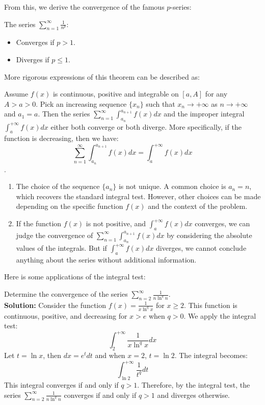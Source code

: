 From this, we derive the convergence of the famous $p$-series:
\begin{corollary}[$p$-Series]
The series $\sum_{n=1}^{\infty} \frac{1}{n^p}$:
\begin{itemize}
    \item Converges if $p > 1$.
    \item Diverges if $p \le 1$.
\end{itemize}
\end{corollary}

More rigorous expressions of this theorem can be described as:

\begin{theorem}
    Assume $f(x)$ is continuous, positive and integrable on $[a,A]$ for any $A>a>0$. Pick an increasing sequence $\{x_n\}$ such that $x_n \to +\infty$ as $n \to +\infty$ and $a_1 = a$. Then the series $\sum_{n=1}^{\infty} \int_{a_n}^{a_{n+1}} f(x) dx$ and the improper integral $\int_a^{+\infty} f(x) dx$ either both converge or both diverge. 
    More specifically, if the function is decreasing, then we have:
    \[\sum_{n=1}^{\infty} \int_{a_n}^{a_{n+1}} f(x) dx = \int_a^{+\infty} f(x) dx\].
\end{theorem}

\begin{remark}
    \begin{enumerate}
        \item The choice of the sequence $\{a_n\}$ is not unique. A common choice is $a_n = n$, which recovers the standard integral test. However, other choices can be made depending on the specific function $f(x)$ and the context of the problem.
        \item If the function $f(x)$ is not positive, and $\int_a^{+\infty} f(x) dx$ converges, we can judge the convergence of $\sum_{n=1}^{\infty} \int_{a_n}^{a_{n+1}} f(x) dx$ by considering the absolute values of the integrals. But if $\int_a^{+\infty} f(x) dx$ diverges, we cannot conclude anything about the series without additional information.
    \end{enumerate}
\end{remark}

Here is some applications of the integral test:

\begin{example}
    Determine the convergence of the series $\sum_{n=2}^{\infty} \frac{1}{n \ln^q n}$. \\
    \textbf{Solution:} Consider the function $f(x) = \frac{1}{x \ln^q x}$ for $x \ge 2$. This function is continuous, positive, and decreasing for $x > e$ when $q > 0$. We apply the integral test:
    \[\int_2^{+\infty} \frac{1}{x \ln^q x} dx \]
    Let $t = \ln x$, then $dx = e^t dt$ and when $x = 2$, $t = \ln 2$. The integral becomes:
    \[\int_{\ln 2}^{+\infty} \frac{1}{t^q} dt \]
    This integral converges if and only if $q > 1$. Therefore, by the integral test, the series $\sum_{n=2}^{\infty} \frac{1}{n \ln^q n}$ converges if and only if $q > 1$ and diverges otherwise.
\end{example}

